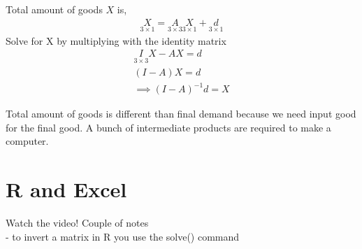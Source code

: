\documentclass{article}
\begin{document}
Total amount of goods $X$ is, 
\begin{align}
    \underset{3 \times 1}{X} = \underset{3 \times 3}{A} \underset{3 \times 1}{X} + \underset{3 \times 1}{d}
 \end{align}
Solve for X by multiplying with the identity matrix 
\begin{align}
    \underset{3 \times 3}{I} X - AX = d\\
    (I - A) X = d\\
    \implies (I - A)^{-1}d = X
\end{align}

Total amount of goods is different than final demand because we need input good for the final good. A bunch of intermediate products are required to make a computer. 


\section{R and Excel}
Watch the video! Couple of notes \\
- to invert a matrix in R you use the solve() command
\end{document}
